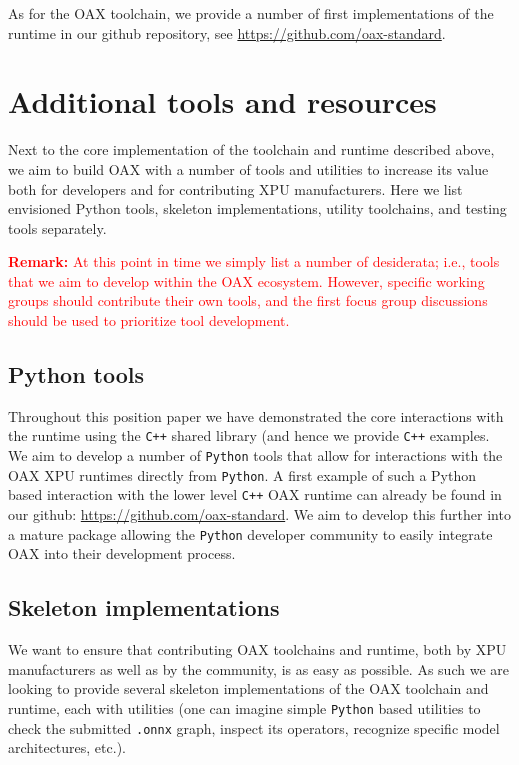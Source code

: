 \documentclass{article}
\newcommand{\remark}[1]{\textcolor{red}{\textbf{\newline Remark:} \newline #1 \newline}}
\newcommand{\oaxgit}{\href{https://github.com/oax-standard}{https://github.com/oax-standard}}
\begin{document}
As for the OAX toolchain, we provide a number of first implementations of the runtime in our github repository, see \oaxgit. 

\section{Additional tools and resources}

Next to the core implementation of the toolchain and runtime described above, we aim to build OAX with a  number of tools and utilities to increase its value both for developers and for contributing XPU manufacturers. Here we list envisioned Python tools, skeleton implementations, utility toolchains, and testing tools separately.

\remark{At this point in time we simply list a number of desiderata; i.e., tools that we aim to develop within the OAX ecosystem. However, specific working groups should contribute their own tools, and the first focus group discussions should be used to prioritize tool development.}

\subsection{Python tools}

Throughout this position paper we have demonstrated the core interactions with the runtime using the \texttt{C++} shared library (and hence we provide \texttt{C++} examples. We aim to develop a number of \texttt{Python} tools that allow for interactions with the OAX XPU runtimes directly from \texttt{Python}. A first example of such a Python based interaction with the lower level \texttt{C++} OAX runtime can already be found in our github: \oaxgit. We aim to develop this further into a mature package allowing the \texttt{Python} developer community to easily integrate OAX into their development process.

\subsection{Skeleton implementations}

We want to ensure that contributing OAX toolchains and runtime, both by XPU manufacturers as well as by the community, is as easy as possible. As such we are looking to provide several skeleton implementations of the OAX toolchain and runtime, each with utilities (one can imagine simple \texttt{Python} based utilities to check the submitted \texttt{.onnx} graph, inspect its operators, recognize specific model architectures, etc.).
\end{document}
